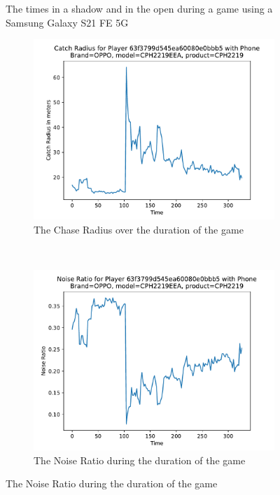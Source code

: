 \documentclass{l4proj}
\begin{document}
\begin{appendices}
\begin{figure}
    \caption{The times in a shadow and in the open during a game using a Samsung Galaxy S21 FE 5G}
    \label{fig:shadows21}
\end{figure}
\begin{figure}
    
    \centering
    \begin{subfigure}[b]{0.48\textwidth}
        \includegraphics[width=\textwidth]{images/OPPO-CPH2219EEA-122-radius.pdf}
        \caption{The Chase Radius over the duration of the game}
        \label{fig:oppocatchradius}
    \end{subfigure}
    ~ %
    \begin{subfigure}[b]{0.48\textwidth}
        \includegraphics[width=\textwidth]{images/OPPO-CPH2219EEA-123-noiseRatio.pdf}
        \caption{The Noise Ratio during the duration of the game}
        \label{fig:opponoiseratio}
    \end{subfigure}
    

\end{figure}
\end{appendices}
\end{document}
